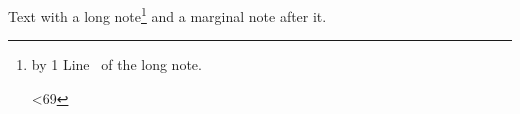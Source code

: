 \documentclass[12pt]{article}
\begin{document}
Text with a long note\footnote{%
  \loop \advance\n by 1
    Line \the\n\ of the long note.\par
  \ifnum\n<69 \repeat}
and a marginal note after it.
\end{document}
